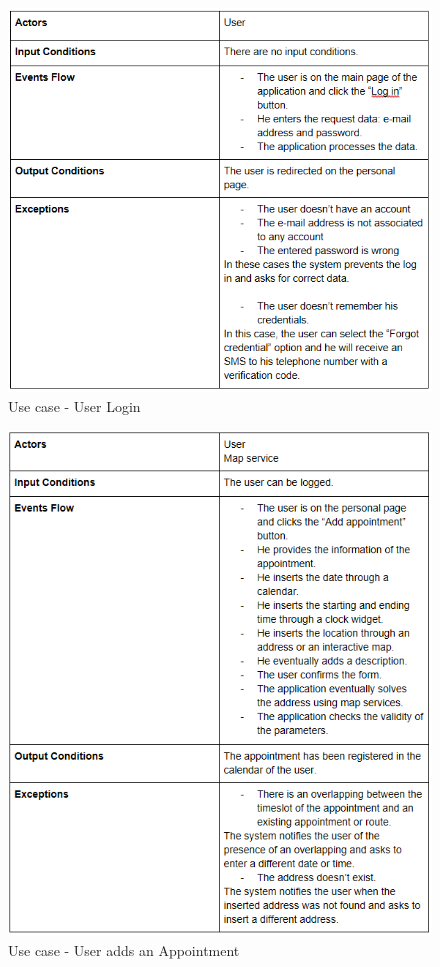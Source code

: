 \begin{figure}
	\centering
	\includegraphics{Images/UseCaseTables/2_user_log.PNG}
	\caption{\label{fig:useCase2}Use case - User Login }
\end{figure}

\begin{figure}
	\centering
	\includegraphics{Images/UseCaseTables/3_usr_add_appo.png}
	\caption{\label{fig:useCase3}Use case - User adds an Appointment }
\end{figure}

